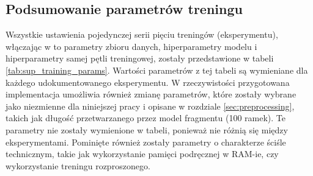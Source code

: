 \subsection{Podsumowanie parametrów treningu}

Wszystkie ustawienia pojedynczej serii pięciu treningów (eksperymentu), włączając w to parametry
zbioru danych, hiperparametry modelu i hiperparametry samej pętli treningowej, zostały przedstawione
w tabeli \ref{tab:sup_training_params}. Wartości parametrów z tej tabeli są wymieniane dla każdego
udokumentowanego eksperymentu. W rzeczywistości przygotowana implementacja umożliwia również zmianę
parametrów, które zostały wybrane jako niezmienne dla niniejszej pracy i opisane w rozdziale
\ref{sec:preprocessing}, takich jak długość przetwarzanego przez model fragmentu (100 ramek). Te
parametry nie zostały wymienione w tabeli, ponieważ nie różnią się między eksperymentami. Pominięte
również zostały parametry o charakterze ściśle technicznym, takie jak wykorzystanie pamięci
podręcznej w RAM-ie, czy wykorzystanie treningu rozproszonego.


